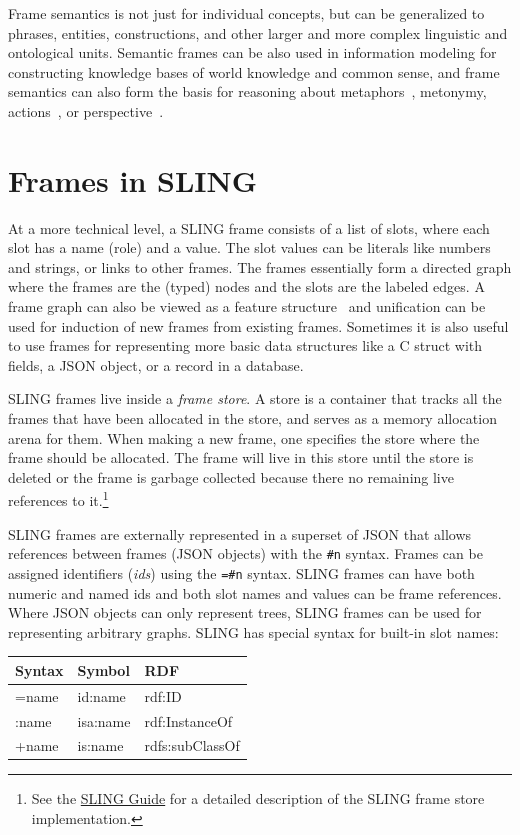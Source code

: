 \documentclass[11pt,a4paper]{article}
\begin{document}
Frame semantics is not just for individual concepts, but can be generalized
to phrases, entities, constructions, and other larger and more complex linguistic
and ontological units. Semantic frames can be also used in information modeling
for constructing knowledge bases of world knowledge and common sense, and frame
semantics can also form the basis for reasoning about
metaphors~\cite{narayanan1999},
metonymy,
actions~\cite{narayanan1999reasoning},
or perspective~\cite{chang2002}.

\section{Frames in SLING}
\label{sec:slingframes}

At a more technical level, a SLING frame consists of a list of slots, where each
slot has a name (role) and a value. The slot values can be literals like numbers
and strings, or links to other frames. The frames essentially form a directed
graph where the frames are the (typed) nodes and the slots are the labeled
edges. A frame graph can also be viewed as a feature structure~\cite{carpenter2005}
and unification can be used for induction of new frames from existing frames.
Sometimes it is also useful to use frames for representing more basic data
structures like a C struct with fields, a JSON object, or a record in a
database.

SLING frames live inside a \emph{frame store}. A store is a container that
tracks all the frames that have been allocated in the store, and serves as a
memory allocation arena for them. When making a new frame, one
specifies the store where the frame should be allocated. The frame will live in
this store until the store is deleted or the frame is garbage collected because
there no remaining live references to it.\footnote{See the \href{https://github.com/google/sling/blob/master/frame/README.md}{SLING Guide}
for a detailed description of the SLING frame store implementation.}

SLING frames are externally represented in a superset of JSON that allows
references between frames (JSON objects) with the {\tt \#n} syntax. Frames can
be assigned identifiers (\emph{ids}) using the {\tt=\#n} syntax. SLING frames
can  have both numeric and named ids and both slot names and values can be frame
references. Where JSON objects can only represent trees, SLING frames can be
used for representing arbitrary graphs. SLING has special syntax for built-in
slot names:

\begin{table}[h!]
\begin{tabular}{|l|l|l|}
\hline
Syntax & Symbol & RDF \\
\hline
=name & id:name & rdf:ID \\
:name & isa:name & rdf:InstanceOf \\
+name & is:name & rdfs:subClassOf \\
\hline
\end{tabular}
\end{table}
\end{document}

